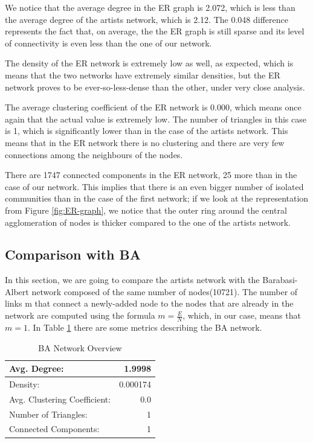 \documentclass[sigchi]{acmart}
\begin{document}
We notice that the average degree in the ER graph is 2.072, which is less than the average degree of the artists network, which is 2.12. The 0.048 difference represents the fact that, on average, the the ER graph is still sparse and its level of connectivity is even less than the one of our network.

The density of the ER network is extremely low as well, as expected, which is means that the two networks have extremely similar densities, but the ER network proves to be ever-so-less-dense than the other, under very close analysis.

The average clustering coefficient of the ER network is 0.000, which means once again that the actual value is extremely low. The number of triangles in this case is 1, which is significantly lower than in the case of the artists network. This means that in the ER network there is no clustering and there are very few connections among the neighbours of the nodes.

There are 1747 connected components in the ER network, 25 more than in the case of our network. This implies that there is an even bigger number of isolated communities than in the case of the first network; if we look at the representation from Figure \ref{fig:ER-graph}, we notice that the outer ring around the central agglomeration of nodes is thicker compared to the one of the artists network.

\subsection{Comparison with BA}

In this section, we are going to compare the artists network with the Barabasi-Albert network composed of the same number of nodes(10721). The number of links m that connect a newly-added node to the nodes that are already in the network are computed using the formula $m=\frac{E}{N}$, which, in our case, means that $m=1$. In Table \ref{tab:BA-metrics} there are some metrics describing the BA network.

\begin{table}[h!]
  \caption{BA Network Overview}
  \label{tab:BA-metrics}
  \begin{tabular}{| l | r |}
    \hline
    Avg. Degree: & 1.9998 \\
    \hline
    Density: & 0.000174 \\
    \hline
    Avg. Clustering Coefficient: & 0.0 \\
    \hline
    Number of Triangles: & 1 \\
    \hline
    Connected Components: & 1 \\
    \hline
    
\end{tabular}
\end{table}
\end{document}
